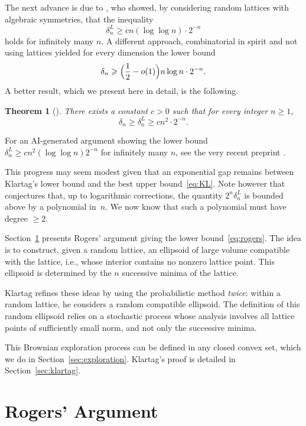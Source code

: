 \documentclass[12pt]{amsart}
\renewcommand{\geq}{\geqslant}
\theoremstyle{plain}
\newtheorem{theorem}{Theorem}
\theoremstyle{remark}
\begin{document}
The next advance is due to \cite{Venkatesh13}, who showed,
by considering random lattices with algebraic symmetries, that the inequality
\[  \delta_n^L \geq c n (\log \log n) \cdot 2^{-n} \]
holds for infinitely many $n$. A different approach, combinatorial in spirit and not using lattices \cite{CJMS23} yielded for every dimension the lower bound
\[ \delta_n \geq \Bigl( \frac{1}{2} - o(1) \Bigr) n \log n \cdot 2^{-n} .\]
A better result, which we present here in detail, is the following.
\begin{theorem}[\cite{Klartag26}] \label{theo:main}
There exists a constant $c>0$ such that for every integer $n \geq 1$,
\[ \delta_n \geq \delta_n^L \geq c n^2 \cdot 2^{-n} .\]
\end{theorem}

For an AI-generated argument showing the lower bound $\delta_n^L \geq c n^2 (\log \log n) 2^{-n}$ for infinitely many $n$, see the very recent preprint \cite{AGZ26}.

 
This progress may seem modest given that an exponential gap remains between Klartag's lower bound and the best upper bound~\eqref{eq:KL}. Note however that \cite{Venkatesh13} conjectures that, up to logarithmic corrections, the quantity $2^n \delta_n^L$ is bounded above by a polynomial in~$n$. We now know that such a polynomial must have degree $\geq 2$.
 
Section~\ref{section:rogers} presents Rogers' argument giving the lower bound~\eqref{eq:rogers}. The idea is to construct, given a random lattice, an ellipsoid of large volume compatible with the lattice, i.e., whose interior contains no nonzero lattice point. This ellipsoid is determined by the $n$ successive minima of the lattice.
 
Klartag refines these ideas by using the probabilistic method \emph{twice}: within a random lattice, he considers a random compatible ellipsoid. The definition of this random ellipsoid relies on a stochastic process whose analysis involves all lattice points of sufficiently small norm, and not only the successive minima.
 
This Brownian exploration process can be defined in any closed convex set, which we do in Section~\ref{sec:exploration}. Klartag's proof is detailed in Section~\ref{sec:klartag}.
 
 
\section{Rogers' Argument} \label{section:rogers}
 
\end{document}
